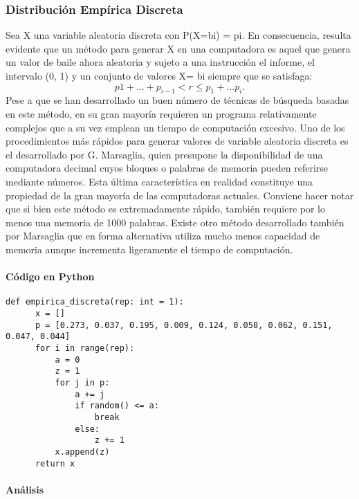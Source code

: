 \documentclass{article}
\begin{document}
  \subsubsection{Distribución Empírica Discreta}
  Sea X una variable aleatoria discreta con P(X=bi) = pi.
  En consecuencia, resulta evidente que un método para generar X en una computadora es aquel que genera un valor de
  baile ahora aleatoria y sujeto a una instrucción el informe, el intervalo (0, 1) y un conjunto de valores X= bi siempre
  que se satisfaga:
  \begin{equation}
    p1 + ... + p_{i-1} < r \leq p_{1} + ... p_{i}.
    \end{equation}
  Pese a que se han desarrollado un buen número de técnicas de búsqueda basadas en este método, en su gran mayoría
  requieren un programa relativamente complejos que a su vez emplean un tiempo de computación excesivo.
  Uno de los procedimientos más rápidos para generar valores de variable aleatoria discreta es el desarrollado por G.
  Marsaglia, quien presupone la disponibilidad de una computadora decimal cuyos bloques o palabras de memoria pueden
  referirse mediante números. Esta última característica en realidad constituye una propiedad de la gran mayoría de las
  computadoras actuales. Conviene hacer notar que si bien este método es extremadamente rápido, también requiere
  por lo menos una memoria de 1000 palabras. Existe otro método desarrollado también por Marsaglia que en forma
  alternativa utiliza mucho menos capacidad de memoria aunque incrementa ligeramente el tiempo de computación.

  \paragraph{Código en Python}
  \begin{lstlisting}[style = Python]
    def empirica_discreta(rep: int = 1):
      x = []
      p = [0.273, 0.037, 0.195, 0.009, 0.124, 0.058, 0.062, 0.151, 0.047, 0.044]
      for i in range(rep):
          a = 0
          z = 1
          for j in p:
              a += j
              if random() <= a:
                  break
              else:
                  z += 1
          x.append(z)
      return x
  \end{lstlisting}

  \paragraph{Análisis}
\end{document}
